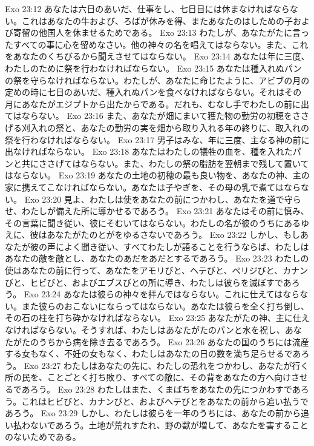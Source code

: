 Exo 23:12  あなたは六日のあいだ、仕事をし、七日目には休まなければならない。これはあなたの牛および、ろばが休みを得、またあなたのはしための子および寄留の他国人を休ませるためである。
Exo 23:13  わたしが、あなたがたに言ったすべての事に心を留めなさい。他の神々の名を唱えてはならない。また、これをあなたのくちびるから聞えさせてはならない。
Exo 23:14  あなたは年に三度、わたしのために祭を行わなければならない。
Exo 23:15  あなたは種入れぬパンの祭を守らなければならない。わたしが、あなたに命じたように、アビブの月の定めの時に七日のあいだ、種入れぬパンを食べなければならない。それはその月にあなたがエジプトから出たからである。だれも、むなし手でわたしの前に出てはならない。
Exo 23:16  また、あなたが畑にまいて獲た物の勤労の初穂をささげる刈入れの祭と、あなたの勤労の実を畑から取り入れる年の終りに、取入れの祭を行わなければならない。
Exo 23:17  男子はみな、年に三度、主なる神の前に出なければならない。
Exo 23:18  あなたはわたしの犠牲の血を、種を入れたパンと共にささげてはならない。また、わたしの祭の脂肪を翌朝まで残して置いてはならない。
Exo 23:19  あなたの土地の初穂の最も良い物を、あなたの神、主の家に携えてこなければならない。あなたは子やぎを、その母の乳で煮てはならない。
Exo 23:20  見よ、わたしは使をあなたの前につかわし、あなたを道で守らせ、わたしが備えた所に導かせるであろう。
Exo 23:21  あなたはその前に慎み、その言葉に聞き従い、彼にそむいてはならない。わたしの名が彼のうちにあるゆえに、彼はあなたがたのとがをゆるさないであろう。
Exo 23:22  しかし、もしあなたが彼の声によく聞き従い、すべてわたしが語ることを行うならば、わたしはあなたの敵を敵とし、あなたのあだをあだとするであろう。
Exo 23:23  わたしの使はあなたの前に行って、あなたをアモリびと、ヘテびと、ペリジびと、カナンびと、ヒビびと、およびエブスびとの所に導き、わたしは彼らを滅ぼすであろう。
Exo 23:24  あなたは彼らの神々を拝んではならない。これに仕えてはならない。また彼らのおこないにならってはならない。あなたは彼らを全く打ち倒し、その石の柱を打ち砕かなければならない。
Exo 23:25  あなたがたの神、主に仕えなければならない。そうすれば、わたしはあなたがたのパンと水を祝し、あなたがたのうちから病を除き去るであろう。
Exo 23:26  あなたの国のうちには流産する女もなく、不妊の女もなく、わたしはあなたの日の数を満ち足らせるであろう。
Exo 23:27  わたしはあなたの先に、わたしの恐れをつかわし、あなたが行く所の民を、ことごとく打ち敗り、すべての敵に、その背をあなたの方へ向けさせるであろう。
Exo 23:28  わたしはまた、くまばちをあなたの先につかわすであろう。これはヒビびと、カナンびと、およびヘテびとをあなたの前から追い払うであろう。
Exo 23:29  しかし、わたしは彼らを一年のうちには、あなたの前から追い払わないであろう。土地が荒れすたれ、野の獣が増して、あなたを害することのないためである。

